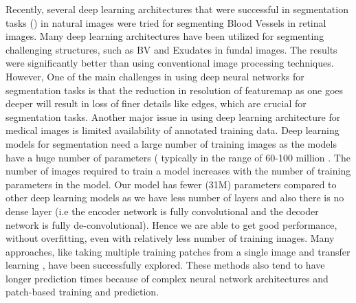 \documentclass[utf8]{FrontiersinHarvard} %
\begin{document}
Recently, several deep learning architectures that were successful in segmentation tasks (\cite{chen2017deeplab}) in natural images  were tried for segmenting Blood Vessels in retinal images.  Many deep learning architectures have been utilized for segmenting challenging structures, such as BV \cite {vengalil2016customizing} \cite{zhuang2018laddernet} \cite{jiang2018retinal} \cite{park2020m} and Exudates \cite{kou2020enhanced,guo2020bin,nur2018exudate} in fundal images. The  results were significantly better than using conventional image processing techniques. However, One of the main challenges in using deep neural networks for segmentation tasks is that the reduction in resolution of featuremap as one goes deeper will result in loss of finer details like edges, which are crucial for segmentation tasks. Another major  issue in using deep learning architecture for medical images is limited availability  of annotated training data. Deep learning models for segmentation need a large number of training images as the models have a huge number of parameters ( typically in the range of  60-100 million  \cite{long2015fully}. The number of images required to train a model increases  with the number of training parameters in the model. Our model has fewer (31M) parameters compared to other deep learning models  as we have less number of layers and also there is no dense layer (i.e the encoder network is fully convolutional and the decoder network is fully de-convolutional). Hence we are able to get good performance, without overfitting, even with relatively less number of training images. Many approaches, like taking multiple training patches from  a single image \cite{vengalil2016customizing} and transfer learning \cite{vengalil2016customizing}, have been successfully explored. These methods also tend to have longer prediction times because of complex neural network architectures and patch-based training and prediction.
\end{document}
